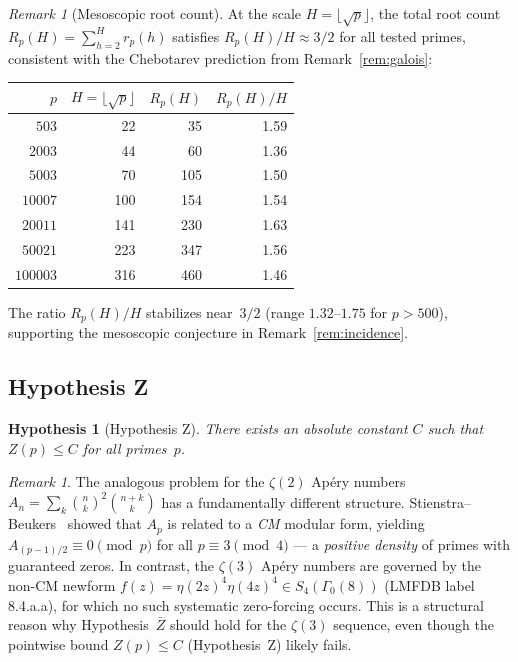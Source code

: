 \documentclass[11pt]{article}
\newtheorem{hypothesis}[theorem]{Hypothesis}
\theoremstyle{definition}
\theoremstyle{remark}
\newtheorem{remark}[theorem]{Remark}
\begin{document}
\begin{remark}[Mesoscopic root count]\label{rem:mesoscopic-data}
At the scale $H = \lfloor\sqrt{p}\rfloor$, the total root
count $R_p(H) = \sum_{h=2}^{H} r_p(h)$ satisfies
$R_p(H)/H \approx 3/2$ for all tested primes, consistent
with the Chebotarev prediction from
Remark~\ref{rem:galois}:
\begin{center}
\begin{tabular}{r|rrr}
$p$ & $H = \lfloor\sqrt{p}\rfloor$ & $R_p(H)$ & $R_p(H)/H$ \\ \hline
$503$ & 22 & 35 & 1.59 \\
$2003$ & 44 & 60 & 1.36 \\
$5003$ & 70 & 105 & 1.50 \\
$10007$ & 100 & 154 & 1.54 \\
$20011$ & 141 & 230 & 1.63 \\
$50021$ & 223 & 347 & 1.56 \\
$100003$ & 316 & 460 & 1.46
\end{tabular}
\end{center}
The ratio $R_p(H)/H$ stabilizes near~$3/2$
(range $1.32$--$1.75$ for $p > 500$), supporting the
mesoscopic conjecture in Remark~\ref{rem:incidence}.
\end{remark}

\subsection{Hypothesis Z}

\begin{hypothesis}[Hypothesis Z]\label{hyp:Z}
There exists an absolute constant $C$ such that $Z(p) \le C$
for all primes~$p$.
\end{hypothesis}

\begin{remark}\label{rem:CM}
The analogous problem for the $\zeta(2)$ Ap\'ery numbers
$A_n = \sum_k \binom{n}{k}^2\binom{n+k}{k}$
has a fundamentally different structure.
Stienstra--Beukers~\cite{SB1985} showed that $A_p$
is related to a \emph{CM} modular form, yielding
$A_{(p-1)/2} \equiv 0 \pmod{p}$ for all
$p \equiv 3 \pmod{4}$ --- a \emph{positive density}
of primes with guaranteed zeros.
In contrast, the $\zeta(3)$ Ap\'ery numbers are governed
by the non-CM newform
$f(z) = \eta(2z)^4\eta(4z)^4 \in S_4(\Gamma_0(8))$
(LMFDB label 8.4.a.a),
for which no such systematic zero-forcing occurs.
This is a structural reason why
Hypothesis~$\bar{Z}$ should hold for the $\zeta(3)$ sequence,
even though the pointwise bound $Z(p) \le C$
(Hypothesis~Z) likely fails.
\end{remark}
\end{document}

